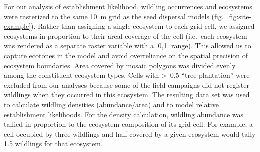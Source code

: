 \documentclass[
]{article}
\begin{document}
For our analysis of establishment likelihood, wildling occurrences and ecosystems were rasterized to the same 10~m grid as the seed dispersal models (fig.~\ref{fig:site-example}).
Rather than assigning a single ecosystem to each grid cell, we assigned ecosystems in proportion to their areal coverage of the cell (i.e.~each ecosystem was rendered as a separate raster variable with a {[}0,1{]} range).
This allowed us to capture ecotones in the model and avoid overreliance on the spatial precision of ecosystem boundaries.
Area covered by mosaic polygons was divided evenly among the constituent ecosystem types.
Cells with \textgreater~0.5 ``tree plantation'' were excluded from our analyses because some of the field campaigns did not register wildlings when they occurred in this ecosystem.
The resulting data set was used to calculate wildling densities (abundance/area) and to model relative establishment likelihoods.
For the density calculation, wildling abundance was tallied in proportion to the ecosystem composition of its grid cell.
For example, a cell occupied by three wildlings and half-covered by a given ecosystem would tally 1.5 wildlings for that ecosystem.
\end{document}
